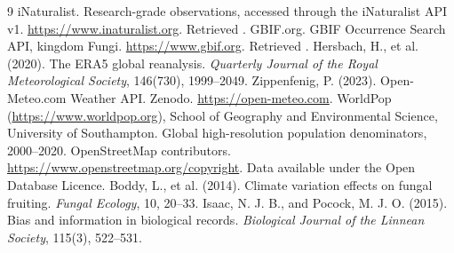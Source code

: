 \documentclass[11pt,a4paper]{article}
\begin{document}
\begin{thebibliography}{9}
 iNaturalist. Research-grade observations, accessed through the iNaturalist API v1.
\url{https://www.inaturalist.org}. Retrieved \MLSRetrievedDate.
 GBIF.org. GBIF Occurrence Search API, kingdom Fungi. \url{https://www.gbif.org}.
Retrieved \MLSRetrievedDate.
 Hersbach, H., et al. (2020). The ERA5 global reanalysis. \emph{Quarterly Journal of the
Royal Meteorological Society}, 146(730), 1999--2049.
 Zippenfenig, P. (2023). Open-Meteo.com Weather API. Zenodo.
\url{https://open-meteo.com}.
 WorldPop (\url{https://www.worldpop.org}), School of Geography and Environmental Science,
University of Southampton. Global high-resolution population denominators, 2000--2020.
 OpenStreetMap contributors. \url{https://www.openstreetmap.org/copyright}. Data available
under the Open Database Licence.
 Boddy, L., et al. (2014). Climate variation effects on fungal fruiting.
\emph{Fungal Ecology}, 10, 20--33.
 Isaac, N. J. B., and Pocock, M. J. O. (2015). Bias and information in biological records.
\emph{Biological Journal of the Linnean Society}, 115(3), 522--531.
\end{thebibliography}
\end{document}
